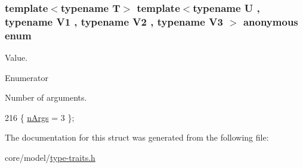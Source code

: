 \subsubsection[{\texorpdfstring{anonymous enum}{anonymous enum}}]{\setlength{\rightskip}{0pt plus 5cm}template$<$typename T$>$ template$<$typename U , typename V1 , typename V2 , typename V3 $>$ anonymous enum}\hypertarget{structTypeTraits_1_1FunctionPtrTraits_3_01U_07_5_08_07V1_00_01V2_00_01V3_08_4_aedb1a2523aeae926873e764a203341dd}{}\label{structTypeTraits_1_1FunctionPtrTraits_3_01U_07_5_08_07V1_00_01V2_00_01V3_08_4_aedb1a2523aeae926873e764a203341dd}
Value. \begin{Desc}
\item[Enumerator]\par
\begin{description}
\item[{\em 
n\+Args\hypertarget{structTypeTraits_1_1FunctionPtrTraits_3_01U_07_5_08_07V1_00_01V2_00_01V3_08_4_aedb1a2523aeae926873e764a203341ddaa9ae8745b08305fa11f604e745f155f8}{}\label{structTypeTraits_1_1FunctionPtrTraits_3_01U_07_5_08_07V1_00_01V2_00_01V3_08_4_aedb1a2523aeae926873e764a203341ddaa9ae8745b08305fa11f604e745f155f8}
}]Number of arguments. \end{description}
\end{Desc}

\begin{DoxyCode}
216 \{ \hyperlink{structTypeTraits_1_1FunctionPtrTraits_3_01U_07_5_08_07V1_00_01V2_00_01V3_08_4_aedb1a2523aeae926873e764a203341ddaa9ae8745b08305fa11f604e745f155f8}{nArgs} = 3                \};
\end{DoxyCode}


The documentation for this struct was generated from the following file\+:\begin{DoxyCompactItemize}
\item 
core/model/\hyperlink{type-traits_8h}{type-\/traits.\+h}\end{DoxyCompactItemize}
